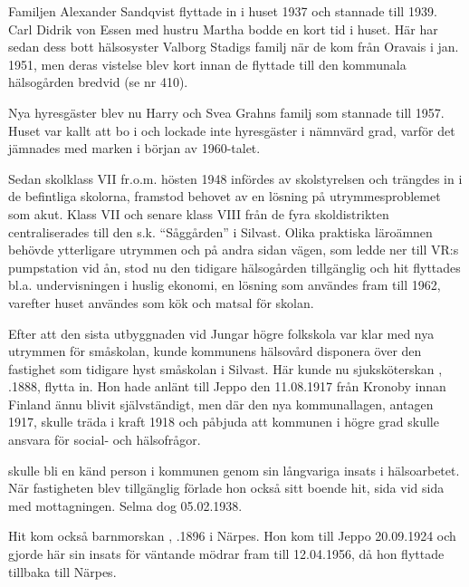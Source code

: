 Familjen Alexander Sandqvist flyttade in i huset 1937 och stannade till 1939.  Carl Didrik von Essen med hustru Martha bodde en kort tid i huset. Här har sedan dess bott hälsosyster Valborg Stadigs familj när de kom från Oravais i jan. 1951, men deras vistelse blev kort innan de flyttade till den kommunala hälsogården bredvid (se nr 410).

Nya hyresgäster blev nu Harry och Svea Grahns familj som stannade till 1957. Huset var kallt att bo i och lockade inte hyresgäster i nämnvärd grad, varför det jämnades med marken i början av 1960-talet.




\jhnooccupant{}


Sedan skolklass VII fr.o.m. hösten 1948 infördes av skolstyrelsen och trängdes in i de befintliga skolorna, framstod behovet av en lösning på utrymmesproblemet som akut. Klass VII och senare klass VIII från de fyra skoldistrikten centraliserades till  den s.k. ``Såggården'' i Silvast. Olika praktiska läroämnen behövde ytterligare utrymmen och på andra sidan vägen, som ledde ner till VR:s pumpstation vid ån, stod nu den tidigare hälsogården tillgänglig och hit flyttades bl.a. undervisningen i huslig ekonomi, en lösning som användes fram till 1962, varefter huset användes som kök och matsal för skolan.

Efter att den sista utbyggnaden vid Jungar högre folkskola var klar med nya utrymmen för småskolan, kunde kommunens hälsovård disponera över den fastighet som tidigare hyst småskolan i Silvast. Här kunde nu sjuksköterskan , .1888, flytta in. Hon hade anlänt till Jeppo den 11.08.1917 från Kronoby innan Finland ännu blivit självständigt, men där den nya kommunallagen, antagen 1917, skulle träda i kraft 1918 och påbjuda att kommunen i högre grad skulle ansvara för social- och hälsofrågor.

 skulle bli en känd person i kommunen genom sin långvariga insats i hälsoarbetet. När fastigheten blev tillgänglig förlade hon också sitt boende hit, sida vid sida med mottagningen. Selma dog 05.02.1938.

Hit kom också barnmorskan , .1896 i Närpes. Hon kom till Jeppo 20.09.1924 och gjorde här sin insats för väntande mödrar fram till 12.04.1956, då hon flyttade tillbaka till Närpes.

